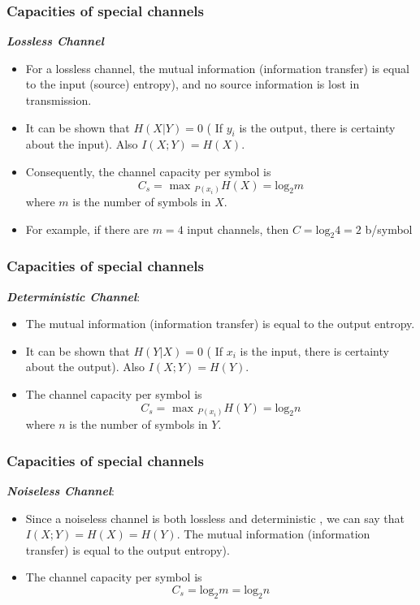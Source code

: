 \documentclass[a4]{beamer}
\begin{document}
\begin{frame}
\frametitle{Capacities of special channels}
\textbf{\emph{Lossless Channel}}\\\begin{itemize} \item For a lossless channel, the mutual information (information transfer) is equal to the input (source) entropy), and no source information is lost in transmission.\item It can be shown that $H(X|Y) = 0$ ( If $y_i$ is the output, there is certainty about the input). Also $I(X;Y) = H(X)$.
\item Consequently, the channel capacity per symbol is
\[ C_s = \mbox{ max }_{P(x_i)} H(X) = \mbox{log}_2m \]
where $m$ is the number of symbols in $X$.
\item For example, if there are $m=4$ input channels, then $C =  \mbox{log}_2 4 = 2$ b/symbol  \end{itemize}
\end{frame}

\begin{frame}
\frametitle{Capacities of special channels}
\textbf{\emph{Deterministic Channel}}:
\begin{itemize}
\item The mutual information (information transfer) is equal to the output entropy.
\item It can be shown that $H(Y|X) = 0$ ( If $x_i$ is the input, there is certainty about the output). Also $I(X;Y) = H(Y)$.
\item  The channel capacity per symbol is
\[ C_s = \mbox{ max }_{P(x_i)} H(Y) = \mbox{log}_2n \]
where $n$ is the number of symbols in $Y$.
\end{itemize}
\end{frame}
\begin{frame}
\frametitle{Capacities of special channels}
\textbf{\emph{Noiseless Channel}}:
\begin{itemize}
\item Since a noiseless channel is both lossless and deterministic , we can say that $I(X;Y) = H(X) = H(Y)$.
The mutual information (information transfer) is equal to the output entropy). \item The channel capacity per symbol is
\[ C_s = \mbox{log}_2m = \mbox{log}_2n \]
\end{itemize}
\end{frame}
\end{document}
